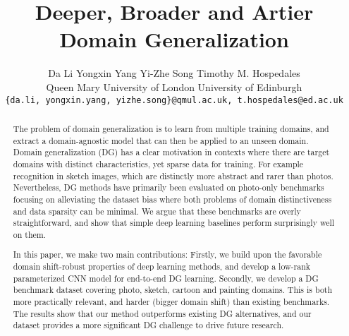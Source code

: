 \documentclass[10pt,twocolumn,letterpaper]{article}
\begin{document}
\title{Deeper, Broader and Artier Domain Generalization}

\author{Da Li \quad Yongxin Yang \quad Yi-Zhe Song \quad Timothy M. Hospedales\\
Queen Mary University of London \quad
University of Edinburgh \\
{\tt\small \{da.li, yongxin.yang, yizhe.song\}@qmul.ac.uk, t.hospedales@ed.ac.uk}
}

\maketitle
\thispagestyle{empty}


\begin{abstract}
The problem of domain generalization is to learn from multiple training domains, and extract a domain-agnostic model that can then be applied to an unseen domain. Domain generalization (DG) has a clear motivation in contexts where there are target domains with distinct characteristics, yet sparse data for training. For example recognition in sketch images, which are distinctly more abstract and rarer than photos. Nevertheless, DG methods have primarily been evaluated on photo-only benchmarks focusing on alleviating the dataset bias where both problems of domain distinctiveness and data sparsity can be minimal. We argue that these benchmarks are overly straightforward, and show that simple deep learning baselines perform surprisingly well on them.

In this paper, we make two main contributions: Firstly, we build upon the favorable domain shift-robust properties of deep learning methods, and develop a low-rank parameterized CNN model for end-to-end DG learning. Secondly, we develop a DG benchmark dataset covering photo, sketch, cartoon and painting domains. This is both more practically relevant, and harder (bigger domain shift) than existing benchmarks. The results show that our method outperforms existing DG alternatives, and our dataset provides a more significant DG challenge to drive future research.
\end{abstract}
\end{document}
